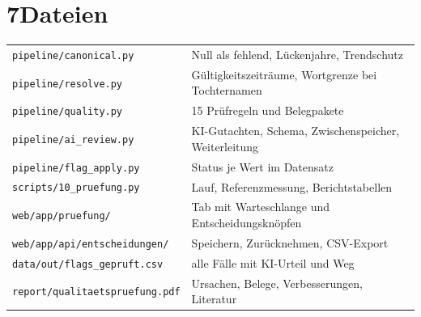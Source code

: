 \documentclass[11pt,a4paper]{article}
\begin{document}
\section*{7\quad Dateien}
\begin{center}\small
\begin{tabularx}{\textwidth}{P{5.6cm} X}
\toprule
\texttt{pipeline/canonical.py} & Null als fehlend, Lückenjahre, Trendschutz \\
\texttt{pipeline/resolve.py} & Gültigkeitszeiträume, Wortgrenze bei Tochternamen \\
\texttt{pipeline/quality.py} & 15 Prüfregeln und Belegpakete \\
\texttt{pipeline/ai\_review.py} & KI-Gutachten, Schema, Zwischenspeicher, Weiterleitung \\
\texttt{pipeline/flag\_apply.py} & Status je Wert im Datensatz \\
\texttt{scripts/10\_pruefung.py} & Lauf, Referenzmessung, Berichtstabellen \\
\texttt{web/app/pruefung/} & Tab mit Warteschlange und Entscheidungsknöpfen \\
\texttt{web/app/api/entscheidungen/} & Speichern, Zurücknehmen, CSV-Export \\
\texttt{data/out/flags\_gepruft.csv} & alle Fälle mit KI-Urteil und Weg \\
\texttt{report/qualitaetspruefung.pdf} & Ursachen, Belege, Verbesserungen, Literatur \\
\bottomrule
\end{tabularx}
\end{center}
\end{document}
